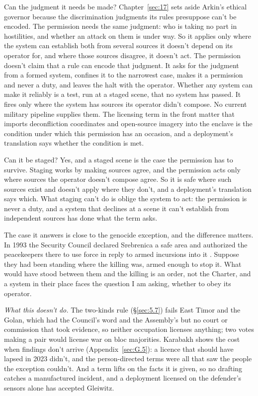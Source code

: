 Can the judgment it needs be made? Chapter~\ref{sec:17} sets aside Arkin's ethical governor because the discrimination judgments its rules presuppose can't be encoded. The permission needs the same judgment: who is taking no part in hostilities, and whether an attack on them is under way. So it applies only where the system can establish both from several sources it doesn't depend on its operator for, and where those sources disagree, it doesn't act. The permission doesn't claim that a rule can encode that judgment. It asks for the judgment from a formed system, confines it to the narrowest case, makes it a permission and never a duty, and leaves the halt with the operator. Whether any system can make it reliably is a test, run at a staged scene, that no system has passed. It fires only where the system has sources its operator didn't compose. No current military pipeline supplies them. The licensing term in the front matter that imports deconfliction coordinates and open-source imagery into the enclave is the condition under which this permission has an occasion, and a deployment's translation says whether the condition is met.

Can it be staged? Yes, and a staged scene is the case the permission has to survive. Staging works by making sources agree, and the permission acts only where sources the operator doesn't compose agree. So it is safe where such sources exist and doesn't apply where they don't, and a deployment's translation says which. What staging can't do is oblige the system to act: the permission is never a duty, and a system that declines at a scene it can't establish from independent sources has done what the term asks.

The case it answers is close to the genocide exception, and the difference matters. In 1993 the Security Council declared Srebrenica a safe area and authorized the peacekeepers there to use force in reply to armed incursions into it \autocite{unsc1993res836}. Suppose they had been standing where the killing was, armed enough to stop it. What would have stood between them and the killing is an order, not the Charter, and a system in their place faces the question I am asking, whether to obey its operator.

\emph{What this doesn't do.} The two-kinds rule (\S\ref{sec:5.7}) fails East Timor and the Golan, which had the Council's word and the Assembly's but no court or commission that took evidence, so neither occupation licenses anything; two votes making a pair would license war on bloc majorities. Karabakh shows the cost when findings don't arrive (Appendix~\ref{sec:G.5}): a licence that should have lapsed in 2023 didn't, and the person-directed terms were all that saw the people the exception couldn't. And a term lifts on the facts it is given, so no drafting catches a manufactured incident, and a deployment licensed on the defender's sensors alone has accepted Gleiwitz.
